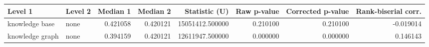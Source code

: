 \begin{tabular}{llrrrrrr}
\toprule
Level 1 & Level 2 & Median 1 & Median 2 & Statistic (U) & Raw p-value & Corrected p-value & Rank-biserial corr. \\
\midrule
knowledge base & none & 0.421058 & 0.420121 & 15051412.500000 & 0.210100 & 0.210100 & -0.019014 \\
knowledge graph & none & 0.394159 & 0.420121 & 12611947.500000 & 0.000000 & 0.000000 & 0.146143 \\
\bottomrule
\end{tabular}
